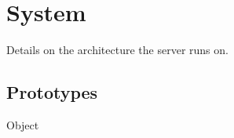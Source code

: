 
\section{System}
Details on the architecture the \urbi server runs on.

\subsection{Prototypes}
\begin{refObjects}
\item[Object]
\end{refObjects}

